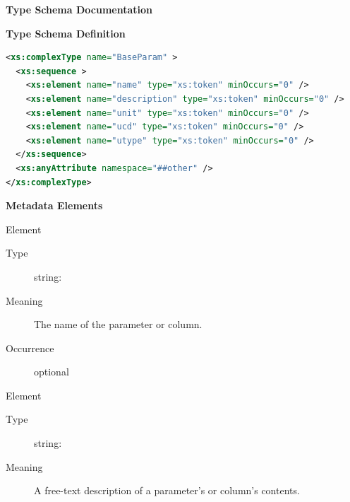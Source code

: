 \documentclass[11pt,a4paper]{ivoa}
\begin{document}
\begin{generated}
\begingroup
        \renewcommand*\descriptionlabel[1]{%
        \hbox to 5.5em{\emph{#1}\hfil}}\vspace{2ex}\noindent\textbf{ Type Schema Documentation}



\vspace{1ex}\noindent\textbf{ Type Schema Definition}

\begin{lstlisting}[language=XML,basicstyle=\footnotesize]
<xs:complexType name="BaseParam" >
  <xs:sequence >
    <xs:element name="name" type="xs:token" minOccurs="0" />
    <xs:element name="description" type="xs:token" minOccurs="0" />
    <xs:element name="unit" type="xs:token" minOccurs="0" />
    <xs:element name="ucd" type="xs:token" minOccurs="0" />
    <xs:element name="utype" type="xs:token" minOccurs="0" />
  </xs:sequence>
  <xs:anyAttribute namespace="##other" />
</xs:complexType>
\end{lstlisting}

\vspace{0.5ex}\noindent\textbf{ Metadata Elements}

\begingroup\small\begin{bigdescription}\item[Element \xmlel{name}]
\begin{description}
\item[Type] string: 
\item[Meaning]
                  The name of the parameter or column.

\item[Occurrence] optional

\end{description}
\item[Element \xmlel{description}]
\begin{description}
\item[Type] string: 
\item[Meaning]
                  A free-text description of a parameter's or column's
                  contents.


\end{description}
\end{bigdescription}
\end{generated}
\end{document}
